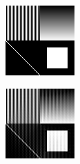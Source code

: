 \documentclass{beamer}
\begin{document}
\begin{frame}
    \begin{center}
        \includegraphics[scale=2]{fig/no_homogenea.png}
    \end{center}
\end{frame}
\begin{frame}
    \begin{center}
        \includegraphics[scale=2]{fig/no_homogenea_comprimida.png}
    \end{center}
\end{frame}
\end{document}
